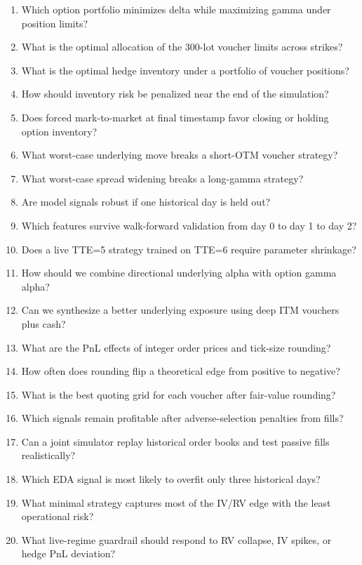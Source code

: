 \documentclass[11pt]{article}
\newcommand{\code}[1]{\texttt{\detokenize{#1}}}
\begin{document}
\begin{enumerate}[label=Q\arabic*.,leftmargin=*]
  \item Which option portfolio minimizes delta while maximizing gamma under position limits?
  \item What is the optimal allocation of the 300-lot voucher limits across strikes?
  \item What is the optimal \code{VELVETFRUIT_EXTRACT} hedge inventory under a portfolio of voucher positions?
  \item How should inventory risk be penalized near the end of the simulation?
  \item Does forced mark-to-market at final timestamp favor closing or holding option inventory?
  \item What worst-case underlying move breaks a short-OTM voucher strategy?
  \item What worst-case spread widening breaks a long-gamma strategy?
  \item Are model signals robust if one historical day is held out?
  \item Which features survive walk-forward validation from day 0 to day 1 to day 2?
  \item Does a live TTE=5 strategy trained on TTE=6 require parameter shrinkage?
  \item How should we combine directional underlying alpha with option gamma alpha?
  \item Can we synthesize a better underlying exposure using deep ITM vouchers plus cash?
  \item What are the PnL effects of integer order prices and tick-size rounding?
  \item How often does rounding flip a theoretical edge from positive to negative?
  \item What is the best quoting grid for each voucher after fair-value rounding?
  \item Which signals remain profitable after adverse-selection penalties from fills?
  \item Can a joint simulator replay historical order books and test passive fills realistically?
  \item Which EDA signal is most likely to overfit only three historical days?
  \item What minimal strategy captures most of the IV/RV edge with the least operational risk?
  \item What live-regime guardrail should respond to RV collapse, IV spikes, or hedge PnL deviation?
\end{enumerate}
\end{document}
